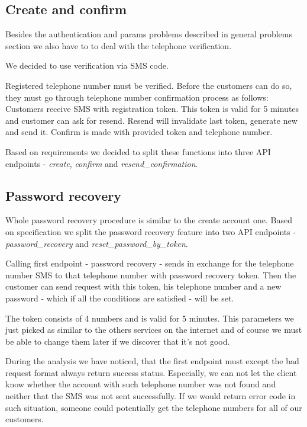 \subsection{Create and confirm}
Besides the authentication and params problems  described in general problems section we also have to to deal with the telephone verification.

We decided to use verification via SMS code.

 Registered telephone number must be verified.  Before the customers can do so, they must go through telephone number confirmation process as follows: Customers receive SMS with registration token. This token is valid for 5 minutes and customer can ask for resend.  Resend will invalidate last token, generate new and send it. Confirm is made with provided token and telephone number.
 
 Based on requirements we decided to split these functions into three API endpoints - \textit{create}, \textit{confirm} and \textit{resend\_confirmation}.
 
 \subsection{Password recovery}
 Whole password recovery procedure is similar to the create account one.
 Based on specification we split the password recovery feature into two API endpoints - \textit{password\_recovery} and \textit{reset\_password\_by\_token}. 
 
 Calling first endpoint - password recovery - sends in exchange for the telephone number SMS to that telephone number with password recovery token. Then the customer can send request with this token, his telephone number and a new password - which if all the conditions are satisfied - will be set. 
 
 The token consists of 4 numbers and is valid for 5 minutes. This parameters we just picked as similar to the others services on the internet and of course we must be able to change them later if we discover that it's not good.
 
 During the analysis we have noticed, that the first endpoint must except the bad request format always return success status. Especially, we can not let the client know whether the account with such telephone number was not found and neither that the SMS was not sent successfully. If we would return error code in such situation, someone could potentially get the telephone numbers for all of our customers.
 
